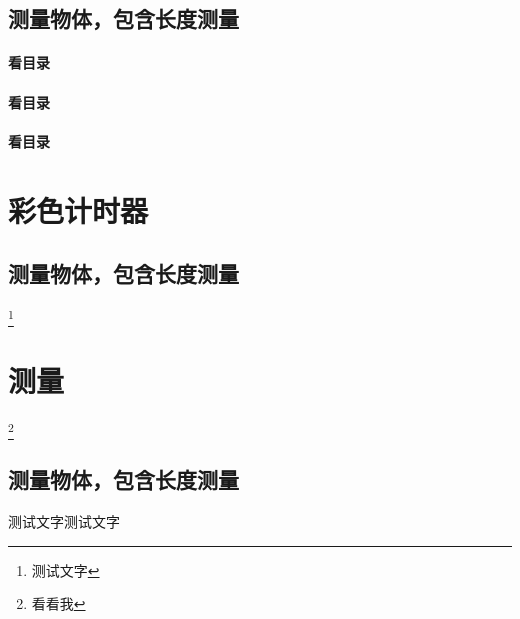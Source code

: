\section{测量物体，包含长度测量}

\subsubsection{看目录}

\subsubsection{看目录}

\subsubsection*{看目录}



%

\chapter{彩色计时器}

\section{测量物体，包含长度测量}

\footnote{测试文字}



\chapter{测量}

\footnote{看看我}\zhlipsum

\section{测量物体，包含长度测量}

\begin{Example}
	测试文字测试文字
\end{Example}




